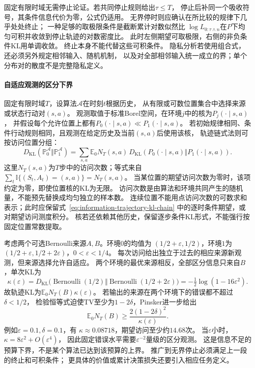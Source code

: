 固定有限时域无需停止论证。若共同停止规则给出\(\tau\leq T\)，
停止后补同一个吸收符号，其条件信息代价为零，公式仍适用。
无界停时则应确认在所比较的规律下几乎处处终止；
一种足够的取极限条件是截断累计对数似然比
\(\log L_{0:\tau\wedge n}\)在\(P\)下均匀可积并收敛到停止轨迹的对数密度比。
此时左侧期望可取极限，右侧的非负条件KL用单调收敛。
终止本身不能代替这些可积条件。
隐私分析若使用组合式，还必须另外规定相邻输入、随机机制，
以及对全部相邻输入统一成立的界；单个分布对的散度不是完整隐私定义。

\paragraph{自适应观测的区分下界}
\label{sec:information-adaptive-lower-bounds}

固定有限时域\(T\)，设算法\(\mathcal A\)在时刻\(t\)根据历史，
从有限或可数位置集合中选择来源或状态行动对\((s,a)\)。
观测取值于标准Borel空间，在环境\(j\)中的核为\(P_j(\cdot\mid s,a)\)，
并假设每个允许位置上都有\(P_0(\cdot\mid s,a)\ll P_1(\cdot\mid s,a)\)。
若初始规律相同、条件行动规则相同，且观测在给定历史及当前\((s,a)\)后使用该核，
轨迹链式法则可按访问位置分组：
\[
  D_{\mathrm{KL}}(\mathbb P_0^{\mathcal A}\Vert\mathbb P_1^{\mathcal A})
  =\sum_{s,a}\mathbb E_0N_T(s,a)\,
      D_{\mathrm{KL}}(P_0(\cdot\mid s,a)\Vert P_1(\cdot\mid s,a)).
\]
这里\(N_T(s,a)\)为\(T\)步中的访问次数；等式来自
\(\sum_t\mathbb I\{(S_t,A_t)=(s,a)\}=N_T(s,a)\)。
当某位置的期望访问次数为零时，该项约定为零，即使位置核的KL为无限。
访问次数是由算法和环境共同产生的随机量，不能预先替换成均匀独立的样本数。
连续位置不能用点访问次数的可数求和表示；此时应保留式~\eqref{eq:information-trajectory-kl-chain}
中的逐时条件期望，或对期望访问测度积分。
核若还依赖其他历史，保留逐步条件KL形式，不能强行按固定位置常数提取。

考虑两个可选Bernoulli来源\(A,B\)。环境\(0\)的均值为
\((1/2+\varepsilon,1/2)\)，环境\(1\)为
\((1/2+\varepsilon,1/2+2\varepsilon)\)，\(0<\varepsilon<1/4\)。
每次访问给出独立于过去的相应来源新观测，但来源选择允许自适应。
两个环境的最优来源相反，全部区分信息只来自\(B\)，单次KL为
\[
  \kappa(\varepsilon)
  =D_{\mathrm{KL}}\bigl(\operatorname{Bernoulli}(1/2)
             \Vert\operatorname{Bernoulli}(1/2+2\varepsilon)\bigr)
  =-\tfrac12\log(1-16\varepsilon^2).
\]
故轨迹KL为\(\mathbb E_0N_T(B)\kappa(\varepsilon)\)。
若输出的来源在两个环境下的错误都不超过\(\delta<1/2\)，
检验恒等式迫使TV至少为\(1-2\delta\)，Pinsker进一步给出
\[
  \mathbb E_0N_T(B)\geq
  \frac{2(1-2\delta)^2}{\kappa(\varepsilon)}.
\]
例如\(\varepsilon=0.1,\delta=0.1\)，有
\(\kappa\approx0.08718\)，期望访问至少约\(14.68\)次。
当\(\varepsilon\)小时，\(\kappa=8\varepsilon^2+O(\varepsilon^4)\)，
因此固定错误水平需要\(\varepsilon^{-2}\)量级的区分观测。
这是信息不足的预算下界，不是某个算法已达到该预算的上界。
推广到无界停止必须满足上一段的终止和可积条件；
更具体的价值或累计决策损失还要引入相应任务定义。

